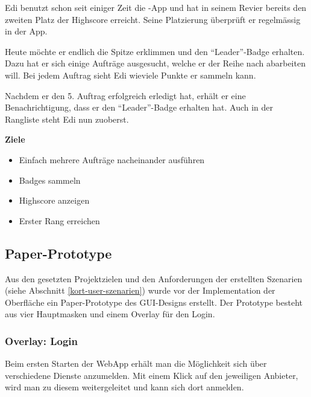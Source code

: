Edi benutzt schon seit einiger Zeit die \kort{}-App und hat in seinem Revier bereits den zweiten Platz der Highscore erreicht.
Seine Platzierung überprüft er regelmässig in der App.

Heute möchte er endlich die Spitze erklimmen und den "`Leader"'-Badge erhalten.
Dazu hat er sich einige Aufträge ausgesucht, welche er der Reihe nach abarbeiten will.
Bei jedem Auftrag sieht Edi wieviele Punkte er sammeln kann.

Nachdem er den 5. Auftrag erfolgreich erledigt hat, erhält er eine Benachrichtigung, dass er den "`Leader"'-Badge erhalten hat.
Auch in der Rangliste steht Edi nun zuoberst.

\textbf{Ziele}
\begin{itemize}
\item Einfach mehrere Aufträge nacheinander ausführen
\item Badges sammeln
\item Highscore anzeigen
\item Erster Rang erreichen
\end{itemize}

\subsection{Paper-Prototype}
\setcounter{subfigure}{0}

Aus den gesetzten Projektzielen und den Anforderungen der erstellten Szenarien (siehe Abschnitt \ref{kort-user-szenarien}) wurde vor der Implementation der Oberfläche ein Paper-Prototype des GUI-Designs erstellt.
Der Prototype besteht aus vier Hauptmasken und einem Overlay für den Login.

\subsubsection{Overlay: Login}
Beim ersten Starten der \gls{WebApp} erhält man die Möglichkeit sich über verschiedene Dienste anzumelden.
Mit einem Klick auf den jeweiligen Anbieter, wird man zu diesem weitergeleitet und kann sich dort anmelden.

